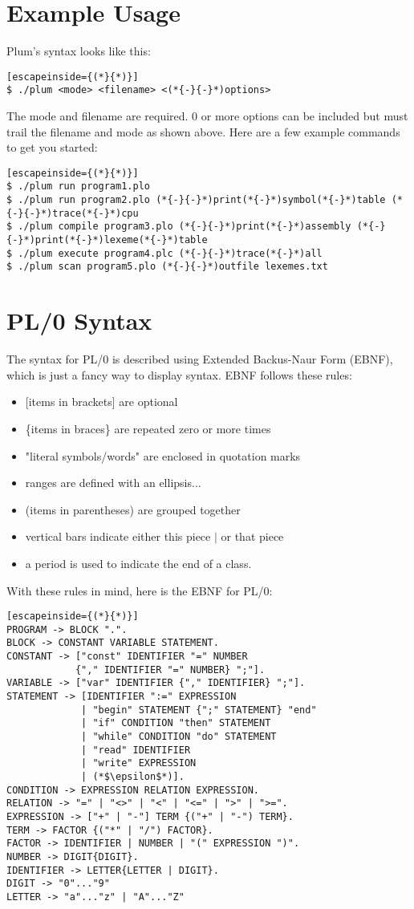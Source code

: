 \documentclass[12pt]{memoir}
\begin{document}
\section*{Example Usage}
Plum's syntax looks like this:
\begin{lstlisting}[escapeinside={(*}{*)}]
$ ./plum <mode> <filename> <(*{-}{-}*)options>
\end{lstlisting}
The mode and filename are required. 0 or more options can be included but must trail
the filename and mode as shown above. Here are a few example commands to get you started:
\begin{lstlisting}[escapeinside={(*}{*)}]
$ ./plum run program1.plo
$ ./plum run program2.plo (*{-}{-}*)print(*{-}*)symbol(*{-}*)table (*{-}{-}*)trace(*{-}*)cpu
$ ./plum compile program3.plo (*{-}{-}*)print(*{-}*)assembly (*{-}{-}*)print(*{-}*)lexeme(*{-}*)table
$ ./plum execute program4.plc (*{-}{-}*)trace(*{-}*)all
$ ./plum scan program5.plo (*{-}{-}*)outfile lexemes.txt
\end{lstlisting}

\pagebreak

\section*{PL/0 Syntax}
The syntax for PL/0 is described using Extended Backus-Naur Form (EBNF), which is just
a fancy way to display syntax. EBNF follows these rules:
\begin{itemize}
    \item {[}items in brackets{]} are optional
    \item \{items in braces\} are repeated zero or more times
    \item "literal symbols/words" are enclosed in quotation marks
    \item ranges are defined with an ellipsis...
    \item (items in parentheses) are grouped together
    \item vertical bars indicate either this piece $|$ or that piece
    \item a period is used to indicate the end of a class.
\end{itemize}
With these rules in mind, here is the EBNF for PL/0:
\begin{lstlisting}[escapeinside={(*}{*)}]
PROGRAM -> BLOCK ".".
BLOCK -> CONSTANT VARIABLE STATEMENT.
CONSTANT -> ["const" IDENTIFIER "=" NUMBER
            {"," IDENTIFIER "=" NUMBER} ";"].
VARIABLE -> ["var" IDENTIFIER {"," IDENTIFIER} ";"].
STATEMENT -> [IDENTIFIER ":=" EXPRESSION
             | "begin" STATEMENT {";" STATEMENT} "end"
             | "if" CONDITION "then" STATEMENT
             | "while" CONDITION "do" STATEMENT
             | "read" IDENTIFIER
             | "write" EXPRESSION
             | (*$\epsilon$*)].
CONDITION -> EXPRESSION RELATION EXPRESSION.
RELATION -> "=" | "<>" | "<" | "<=" | ">" | ">=".
EXPRESSION -> ["+" | "-"] TERM {("+" | "-") TERM}.
TERM -> FACTOR {("*" | "/") FACTOR}.
FACTOR -> IDENTIFIER | NUMBER | "(" EXPRESSION ")".
NUMBER -> DIGIT{DIGIT}.
IDENTIFIER -> LETTER{LETTER | DIGIT}.
DIGIT -> "0"..."9"
LETTER -> "a"..."z" | "A"..."Z"
\end{lstlisting}
\end{document}
